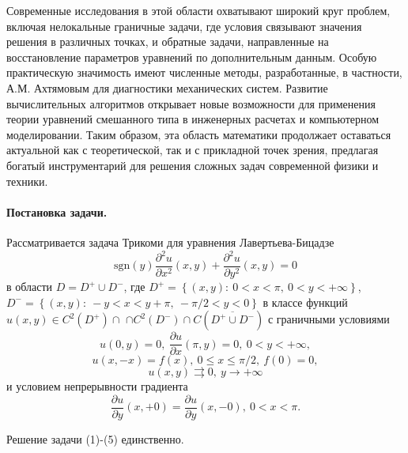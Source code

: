 \begin{vkrthesis}
Современные исследования в этой области охватывают широкий круг проблем, включая нелокальные граничные задачи, где условия связывают значения решения в различных точках, и обратные задачи, направленные на восстановление параметров уравнений по дополнительным данным. Особую практическую значимость имеют численные методы, разработанные, в частности, А.М. Ахтямовым для диагностики механических систем. Развитие вычислительных алгоритмов открывает новые возможности для применения теории уравнений смешанного типа в инженерных расчетах и компьютерном моделировании. Таким образом, эта область математики продолжает оставаться актуальной как с теоретической, так и с прикладной точек зрения, предлагая богатый инструментарий для решения сложных задач современной физики и техники.

\paragraph{Постановка задачи.}
	Рассматривается задача Трикоми для уравнения Лавертьева-Бицадзе
\begin{equation}
	\mathrm{sgn} (y) \dfrac{\partial^2 u}{\partial x^2}(x,y) + \dfrac{\partial^2 u}{\partial y^2}(x,y) = 0
\end{equation}
в области $D = D^{+} \cup D^{-}$, где $D^{+} = \left\{(x,y): \ 0 < x < \pi, \ 0 < y < + \infty \right\}$, \newline
$D^{-} = \left\{(x,y): \ -y < x < y + \pi, \ -\pi/2 < y < 0\right\}$ в классе функций $u(x,y) \in C^2(D^{+}) \cap$ $\cap C^2(D^{-}) \cap C(\overline{D^{+} \cup D^{-}})$ с граничными условиями
\begin{equation}
	u(0,y) = 0, \ \dfrac{\partial u}{\partial x}(\pi, y) = 0, \ 0 < y < + \infty,
\end{equation}
\begin{equation}
	u(x,-x) = f(x) , \ 0 \leq x \leq \pi/2, \ f(0) = 0, 
\end{equation}
\begin{equation}
	u(x,y) \rightrightarrows 0, \ y \to +\infty
\end{equation}
и условием непрерывности градиента
\begin{equation}
	\dfrac{\partial u}{\partial y}(x, +0) = \dfrac{\partial u}{\partial y} (x, -0), \ 0 < x < \pi.
\end{equation}
\begin{theorem}
	\label{th:fivebf}
	Решение задачи (1)-(5) единственно.
\end{theorem}

\end{vkrthesis}

